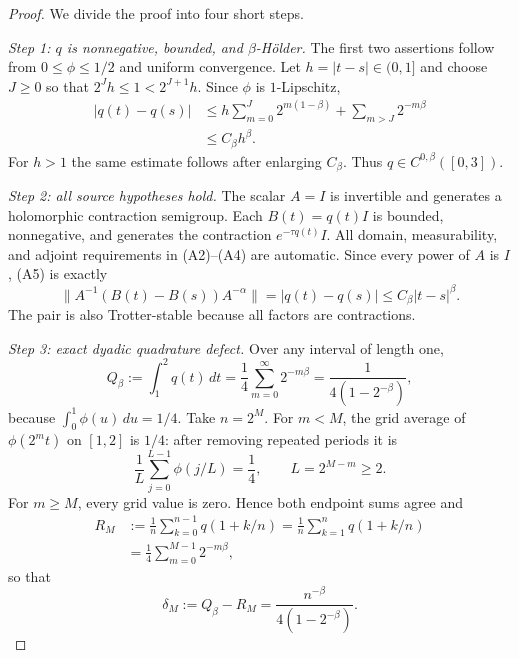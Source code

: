 \documentclass[11pt]{article}
\begin{document}
\begin{proof}
We divide the proof into four short steps.

\emph{Step 1: $q$ is nonnegative, bounded, and $\beta$-H\"older.}
The first two assertions follow from $0\le\phi\le1/2$ and uniform
convergence.  Let $h=|t-s|\in(0,1]$ and choose $J\ge0$ so that
$2^Jh\le1<2^{J+1}h$.  Since $\phi$ is $1$-Lipschitz,
\begin{align*}
 |q(t)-q(s)|
 &\le h\sum_{m=0}^{J}2^{m(1-\beta)}
   +\sum_{m>J}2^{-m\beta}\\
 &\le C_\beta h^\beta.
\end{align*}
For $h>1$ the same estimate follows after enlarging $C_\beta$.  Thus
$q\in C^{0,\beta}([0,3])$.

\emph{Step 2: all source hypotheses hold.}
The scalar $A=I$ is invertible and generates a holomorphic contraction
semigroup.  Each $B(t)=q(t)I$ is bounded, nonnegative, and generates the
contraction $e^{-\tau q(t)}I$.  All domain, measurability, and adjoint
requirements in (A2)--(A4) are automatic.  Since every power of $A$ is $I$,
(A5) is exactly
\[
 \|A^{-1}(B(t)-B(s))A^{-\alpha}\|
 =|q(t)-q(s)|\le C_\beta|t-s|^\beta.
\]
The pair is also Trotter-stable because all factors are contractions.

\emph{Step 3: exact dyadic quadrature defect.}
Over any interval of length one,
\[
 Q_\beta:=\int_1^2q(t)\,dt
 =\frac14\sum_{m=0}^{\infty}2^{-m\beta}
 =\frac{1}{4(1-2^{-\beta})},
\]
because $\int_0^1\phi(u)\,du=1/4$.  Take $n=2^M$.  For $m<M$, the
grid average of $\phi(2^m t)$ on $[1,2]$ is $1/4$: after removing repeated
periods it is
\[
 \frac1L\sum_{j=0}^{L-1}\phi(j/L)=\frac14,
 \qquad L=2^{M-m}\ge2.
\]
For $m\ge M$, every grid value is zero.  Hence both endpoint sums agree and
\begin{align*}
 R_M
 &:=\frac1n\sum_{k=0}^{n-1}q(1+k/n)
  =\frac1n\sum_{k=1}^{n}q(1+k/n)\\
 &=\frac14\sum_{m=0}^{M-1}2^{-m\beta},
\end{align*}
so that
\begin{equation}\label{eq:defect}
 \delta_M:=Q_\beta-R_M
 =\frac{n^{-\beta}}{4(1-2^{-\beta})}.
\end{equation}


\end{proof}
\end{document}
